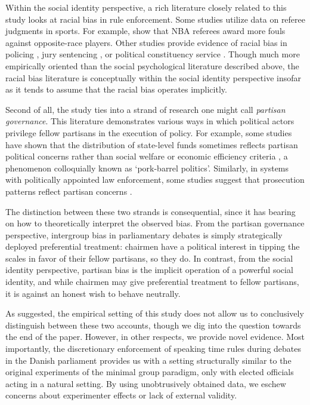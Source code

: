 \documentclass[12pt,a4paper]{article}
\begin{document}
Within the social identity perspective, a rich literature closely related to this study looks at racial bias in rule enforcement. Some studies utilize data on referee judgments in sports. For example, \cite{Price2010} show that NBA referees award more fouls against opposite-race players. Other studies provide evidence of racial bias in policing \citep{Donohue2001,Antonovics2009}, jury sentencing \citep{Anwar2012}, or political constituency service \citep{Butler2011}. Though much more empirically oriented than the social psychological literature described above, the racial bias literature is conceptually within the social identity perspective insofar as it tends to assume that the racial bias operates implicitly.

Second of all, the study ties into a strand of research one might call \textit{partisan governance}. This literature demonstrates various ways in which political actors privilege fellow partisans in the execution of policy. For example, some studies have shown that the distribution of state-level funds sometimes reflects partisan political concerns rather than social welfare or economic efficiency criteria \citep{Dahlberg2002,Stratmann2002,Larcinese2008}, a phenomenon colloquially known as `pork-barrel politics'. Similarly, in systems with politically appointed law enforcement, some studies suggest that prosecution patterns reflect partisan concerns \citep{Gordon2009}.

The distinction between these two strands is consequential, since it has bearing on how to theoretically interpret the observed bias. From the partisan governance perspective, intergroup bias in parliamentary debates is simply strategically deployed preferential treatment: chairmen have a political interest in tipping the scales in favor of their fellow partisans, so they do. In contrast, from the social identity perspective, partisan bias is the implicit operation of a powerful social identity, and while chairmen may give preferential treatment to fellow partisans, it is against an honest wish to behave neutrally.

As suggested, the empirical setting of this study does not allow us to conclusively distinguish between these two accounts, though we dig into the question towards the end of the paper. However, in other respects, we provide novel evidence. Most importantly, the discretionary enforcement of speaking time rules during debates in the Danish parliament provides us with a setting structurally similar to the original experiments of the minimal group paradigm, only with elected officials acting in a natural setting. By using unobtrusively obtained data, we eschew concerns about experimenter effects or lack of external validity.
\end{document}
